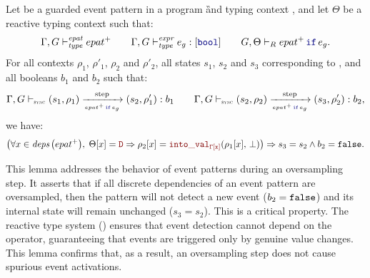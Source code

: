 \begin{lemma}
    \label{lem:semantics:grsync:theorems:oversampling:epat}
    Let  be a guarded event pattern in a program \G and typing
    context \tyCtx, and let $\Theta$ be a reactive typing context such that:
    \begin{equation*}
        \epatTyped{epat^+} \qquad \exprTyped{e_g}{\kwf{bool}} \qquad \epatTypedReact{\Theta}{\guarded{epat^+}{e_g}}.
    \end{equation*}
    For all contexts $\rho_1$, $\rho'_1$, $\rho_2$ and $\rho'_2$, all states $s_1$, $s_2$ and $s_3$
    corresponding to , and all booleans $b_1$ and $b_2$ such that:
    \begin{equation*}
        \epatOpsem{\rho_1}{s_1}{\guarded{epat^+}{e_g}}{s_2}{b_1}{\rho'_1} \qquad
        \epatOpsem{\rho_2}{s_2}{\guarded{epat^+}{e_g}}{s_3}{b_2}{\rho'_2},
    \end{equation*}
    we have:
    \begin{multline*}
        \left(\forall x \in \deps{epat^+}, \; \Theta[x] = \dType \Rightarrow \rho_2[x] = \intoVal{\tyCtx[x]}{\rho_1[x]}{\bot}\right) \Rightarrow
        s_3 = s_2 \wedge b_2 = \false.
    \end{multline*}

    This lemma addresses the behavior of event patterns during an oversampling step. It asserts that
    if all discrete dependencies of an event pattern are oversampled, then the pattern will not
    detect a new event ($b_2 = \mathtt{{false}}$) and its internal state will remain unchanged ($s_3 = s_2$).
    This is a critical property. The reactive type system
    () ensures that event detection cannot depend on the
    \timeop operator, guaranteeing that events are triggered only by genuine value changes. This
    lemma confirms that, as a result, an oversampling step does not cause spurious event
    activations.
\end{lemma}
